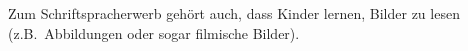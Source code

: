 Zum Schriftspracherwerb gehört auch, dass Kinder lernen, Bilder zu lesen (z.B.\ Abbildungen oder sogar filmische Bilder).